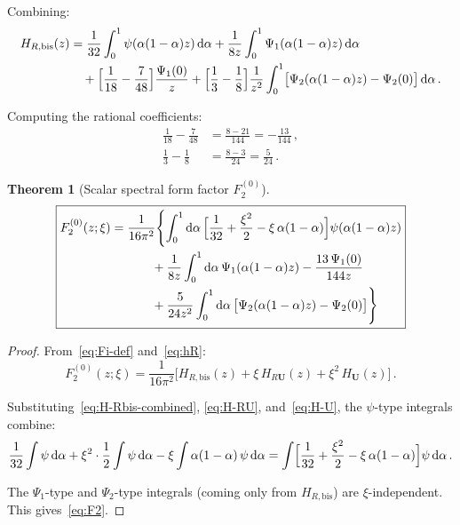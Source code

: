 \documentclass[11pt,a4paper]{article}
\newcommand{\dd}{\mathrm{d}}
\newtheorem{theorem}{Theorem}[section]
\theoremstyle{definition}
\theoremstyle{remark}
\begin{document}
Combining:
\begin{align}
  H_{R,\text{bis}}(z) &=
  \frac{1}{32}\int_0^1\psi(\alpha(1-\alpha)z)\,\dd\alpha
  + \frac{1}{8z}\int_0^1\Psi_1(\alpha(1-\alpha)z)\,\dd\alpha
  \nonumber\\
  &\quad
  + \Bigl[\frac{1}{18} - \frac{7}{48}\Bigr]\frac{\Psi_1(0)}{z}
  + \Bigl[\frac{1}{3} - \frac{1}{8}\Bigr]
  \frac{1}{z^2}\int_0^1\bigl[\Psi_2(\alpha(1-\alpha)z)
  - \Psi_2(0)\bigr]\,\dd\alpha\,.
  \label{eq:H-Rbis-combined}
\end{align}

Computing the rational coefficients:
\begin{align*}
  \frac{1}{18} - \frac{7}{48}
  &= \frac{8 - 21}{144} = -\frac{13}{144}\,,\\[4pt]
  \frac{1}{3} - \frac{1}{8}
  &= \frac{8 - 3}{24} = \frac{5}{24}\,.
\end{align*}

\begin{theorem}[Scalar spectral form factor $F_2^{(0)}$]
\label{thm:F2}
\begin{equation}
  \boxed{
  \begin{aligned}
  F_2^{(0)}(z;\xi)
  &= \frac{1}{16\pi^2}\Biggl\{
    \int_0^1 \dd\alpha\,
    \Bigl[\frac{1}{32} + \frac{\xi^2}{2}
    - \xi\,\alpha(1-\alpha)\Bigr]
    \psi(\alpha(1-\alpha)z)\\
  &\quad\quad\quad\;
    + \frac{1}{8z}\int_0^1 \dd\alpha\,
      \Psi_1(\alpha(1-\alpha)z)
    - \frac{13\,\Psi_1(0)}{144z}\\
  &\quad\quad\quad\;
    + \frac{5}{24z^2}\int_0^1 \dd\alpha\,
      \bigl[\Psi_2(\alpha(1-\alpha)z) - \Psi_2(0)\bigr]
  \Biggr\}
  \end{aligned}
  }
  \label{eq:F2}
\end{equation}
\end{theorem}

\begin{proof}
From~\eqref{eq:Fi-def} and~\eqref{eq:hR}:
\begin{equation*}
  F_2^{(0)}(z;\xi) = \frac{1}{16\pi^2}\bigl[
  H_{R,\text{bis}}(z) + \xi\,H_{R\mathbf{U}}(z)
  + \xi^2\,H_{\mathbf{U}}(z)\bigr]\,.
\end{equation*}

Substituting~\eqref{eq:H-Rbis-combined}, \eqref{eq:H-RU},
and~\eqref{eq:H-U}, the $\psi$-type integrals combine:
\begin{equation*}
  \frac{1}{32}\int\psi\,\dd\alpha
  + \xi^2\cdot\frac{1}{2}\int\psi\,\dd\alpha
  - \xi\int\alpha(1-\alpha)\,\psi\,\dd\alpha
  = \int\Bigl[\frac{1}{32} + \frac{\xi^2}{2}
  - \xi\,\alpha(1-\alpha)\Bigr]\psi\,\dd\alpha\,.
\end{equation*}

The $\Psi_1$-type and $\Psi_2$-type integrals (coming only from
$H_{R,\text{bis}}$) are $\xi$-independent.  This gives~\eqref{eq:F2}.
\end{proof}
\end{document}

